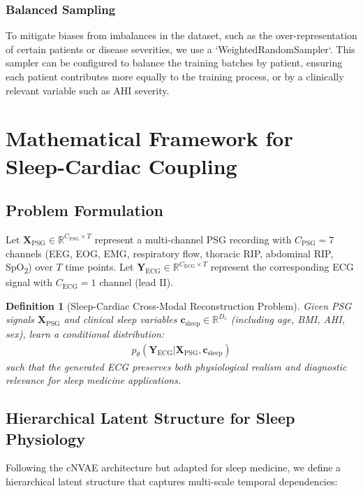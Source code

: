 \documentclass[10pt, conference]{IEEEtran}
\newtheorem{definition}{Definition}
\begin{document}
\subsubsection{Balanced Sampling}
To mitigate biases from imbalances in the dataset, such as the over-representation of certain patients or disease severities, we use a `WeightedRandomSampler`. This sampler can be configured to balance the training batches by patient, ensuring each patient contributes more equally to the training process, or by a clinically relevant variable such as AHI severity.

\section{Mathematical Framework for Sleep-Cardiac Coupling}

\subsection{Problem Formulation}

Let $\mathbf{X}_{\text{PSG}} \in \mathbb{R}^{C_{\text{PSG}} \times T}$ represent a multi-channel PSG recording with $C_{\text{PSG}} = 7$ channels (EEG, EOG, EMG, respiratory flow, thoracic RIP, abdominal RIP, SpO\textsubscript{2}) over $T$ time points. Let $\mathbf{Y}_{\text{ECG}} \in \mathbb{R}^{C_{\text{ECG}} \times T}$ represent the corresponding ECG signal with $C_{\text{ECG}} = 1$ channel (lead II).

\begin{definition}[Sleep-Cardiac Cross-Modal Reconstruction Problem]
Given PSG signals $\mathbf{X}_{\text{PSG}}$ and clinical sleep variables $\mathbf{c}_{\text{sleep}} \in \mathbb{R}^{D_c}$ (including age, BMI, AHI, sex), learn a conditional distribution:
\begin{align}
p_\theta(\mathbf{Y}_{\text{ECG}} | \mathbf{X}_{\text{PSG}}, \mathbf{c}_{\text{sleep}})
\end{align}
such that the generated ECG preserves both physiological realism and diagnostic relevance for sleep medicine applications.
\end{definition}

\subsection{Hierarchical Latent Structure for Sleep Physiology}

Following the cNVAE architecture but adapted for sleep medicine, we define a hierarchical latent structure that captures multi-scale temporal dependencies:
\end{document}
